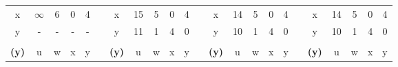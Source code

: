 \documentclass{article}
\begin{document}
\begin{latin}
\begin{table}[H]
\begin{tabular}{ccccccccccccccccccccccc}
\multicolumn{1}{|c|}{x}            & $\infty$               & 6                      & 0                      & 4                      & \multicolumn{1}{c|}{}                  & \multicolumn{1}{c|}{x}            & 15                     & 5                      & 0                      & 4                      & \multicolumn{1}{c|}{}                  & \multicolumn{1}{c|}{x}            & 14                     & 5                      & 0                      & 4                      & \multicolumn{1}{c|}{}                  & \multicolumn{1}{c|}{x}            & 14                     & 5                      & 0                      & 4                      \\ \cline{1-1} \cline{7-7} \cline{13-13} \cline{19-19}
\multicolumn{1}{|c|}{y}            & -                      & -                      & -                      & -                      & \multicolumn{1}{c|}{}                  & \multicolumn{1}{c|}{y}            & 11                     & 1                      & 4                      & 0                      & \multicolumn{1}{c|}{}                  & \multicolumn{1}{c|}{y}            & 10                     & 1                      & 4                      & 0                      & \multicolumn{1}{c|}{}                  & \multicolumn{1}{c|}{y}            & 10                     & 1                      & 4                      & 0                      \\ \cline{1-1} \cline{7-7} \cline{13-13} \cline{19-19}
                                   &                        &                        &                        &                        &                                        &                                   &                        &                        &                        &                        &                                        &                                   &                        &                        &                        &                        &                                        &                                   &                        &                        &                        &                        \\ \cline{1-5} \cline{7-11} \cline{13-17} \cline{19-23} 
\multicolumn{1}{|c|}{\textbf{(y)}} & \multicolumn{1}{c|}{u} & \multicolumn{1}{c|}{w} & \multicolumn{1}{c|}{x} & \multicolumn{1}{c|}{y} & \multicolumn{1}{c|}{}                  & \multicolumn{1}{c|}{\textbf{(y)}} & \multicolumn{1}{c|}{u} & \multicolumn{1}{c|}{w} & \multicolumn{1}{c|}{x} & \multicolumn{1}{c|}{y} & \multicolumn{1}{c|}{}                  & \multicolumn{1}{c|}{\textbf{(y)}} & \multicolumn{1}{c|}{u} & \multicolumn{1}{c|}{w} & \multicolumn{1}{c|}{x} & \multicolumn{1}{c|}{y} & \multicolumn{1}{c|}{}                  & \multicolumn{1}{c|}{\textbf{(y)}} & \multicolumn{1}{c|}{u} & \multicolumn{1}{c|}{w} & \multicolumn{1}{c|}{x} & \multicolumn{1}{c|}{y} \\ \cline{1-5} \cline{7-11} \cline{13-17} \cline{19-23} 

\end{tabular}
\end{table}
\end{latin}
\end{document}
